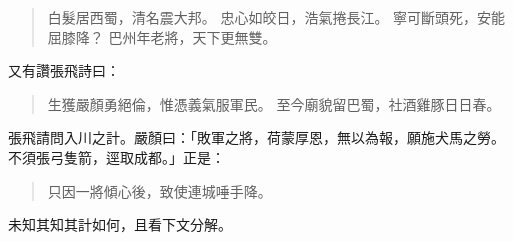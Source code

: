 \begin{quote}
白髮居西蜀，清名震大邦。
忠心如皎日，浩氣捲長江。
寧可斷頭死，安能屈膝降？
巴州年老將，天下更無雙。
\end{quote}

又有讚張飛詩曰：

\begin{quote}
生獲嚴顏勇絕倫，惟憑義氣服軍民。
至今廟貌留巴蜀，社酒雞豚日日春。
\end{quote}

張飛請問入川之計。嚴顏曰：「敗軍之將，荷蒙厚恩，無以為報，願施犬馬之勞。不須張弓隻箭，逕取成都。」正是：

\begin{quote}
只因一將傾心後，致使連城唾手降。
\end{quote}

未知其知其計如何，且看下文分解。
